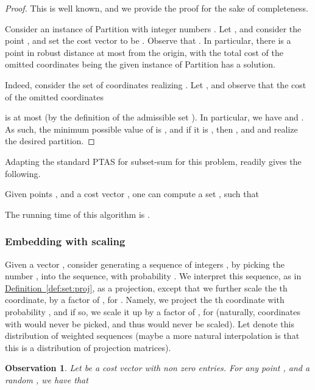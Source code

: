 \documentclass[12pt]{article}\usepackage[cm]{fullpage}
\newcommand{\Term}[1]{\textsf{#1}}
\newtheorem{observation}[theorem]{Observation}
\theoremstyle{remark}\theoremheaderfont{\sf}\theorembodyfont{\upshape}\newtheorem{defn}[theorem]{Definition}
\numberwithin{figure}{section}\numberwithin{table}{section}\numberwithin{equation}{section}
\newcommand{\HLink}[2]{\hyperref[#2]{#1~\ref*{#2}}}
\newcommand{\defref}[1]{\HLink{Definition}{def:#1}}
\newcommand{\lemlab}[1]{\label{lemma:#1}}
\newcommand{\obslab}[1]{\label{observation:#1}}
\renewcommand{\th}{th\xspace}
\providecommand{\ProblemC}[1]{\textsf{#1}}
\newcommand{\PTAS}{\Term{PTAS}\xspace}\newcommand{\LSH}{\Term{LSH}\xspace}
\begin{document}
\begin{proof}
    This is well known, and we provide the proof for the sake of
    completeness.

    Consider an instance of \ProblemC{Partition} with integer numbers
    . Let , and consider
    the point , and set
    the cost vector to be . Observe that
    . In particular, there is a
    point in robust distance at most  from the origin, with the
    total cost of the omitted coordinates being   the given
    instance of \ProblemC{Partition} has a solution.

    Indeed, consider the set of coordinates  realizing
    .  Let
    , and observe that the
    cost of the omitted coordinates
    
    is at most  (by the definition of the admissible set
    ). In particular, we have 
    and . As such, the minimum possible value of 
    is , and if it is , then , and  and
     realize the desired partition.
\end{proof}



Adapting the standard \PTAS for subset-sum for this problem, readily
gives the following.

\begin{lemma}
    \lemlab{i-aamkp}Given points , and a cost vector
    , one can compute a set
    , such that
    
    The running time of this algorithm is .
\end{lemma}

\subsubsection{Embedding with scaling}

Given a vector  , consider generating a sequence
 of integers , by picking the number
, into the sequence, with probability .  We
interpret this sequence, as in \defref{set:proj}, as a projection,
except that we further scale the \th coordinate, by a factor of
, for . Namely, we project the \th
coordinate with probability , and if so, we scale it up by a
factor of , for  (naturally, coordinates
with  would never be picked, and thus would never be
scaled). Let  denote this distribution of weighted
sequences (maybe a more natural interpolation is that this is a
distribution of projection matrices).

\begin{observation}
    \obslab{norm:1}Let  be a cost vector with non zero entries.
    For any point , and a random
    , we have that
    
\end{observation}
\end{document}

